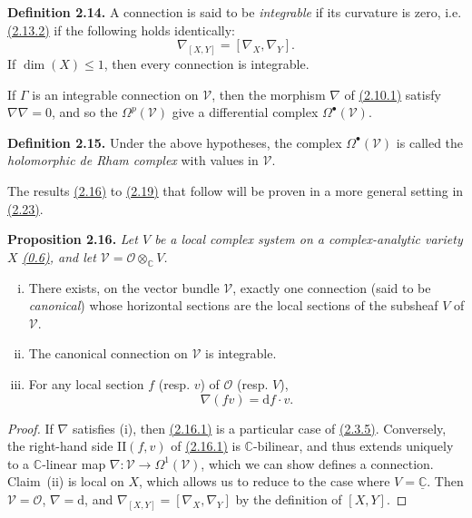 \documentclass{report}
\newenvironment{itenv}[1]
  {\phantomsection\par\medskip\noindent\textbf{#1.}\itshape}
  {\medskip}
\newenvironment{rmenv}[1]
  {\phantomsection\par\medskip\noindent\textbf{#1.}\rmfamily}
  {\medskip}
\renewcommand{\cal}[1]{{\mathcal{#1}}}
\newcommand{\CC}{\mathbb{C}}
\newcommand{\dd}{\mathrm{d}}
\newcommand{\II}{\mathrm{II}}
\renewcommand{\leq}{\leqslant}
\newcommand{\oldpage}[1]{\marginpar{\footnotesize$\Big\vert$ \textit{p.~#1}}}
\begin{document}
\begin{rmenv}{Definition 2.14}
\label{I.2.14}
  A connection is said to be \emph{integrable} if its curvature is zero, i.e. \hyperref[I.2.13.2]{(2.13.2)} if the following holds identically:
  \[
    \nabla_{[X,Y]} = [\nabla_X,\nabla_Y].
  \]
\end{rmenv}
If $\dim(X)\leq1$, then every connection is integrable.

If $\Gamma$ is an integrable connection on $\cal{V}$, then the morphism $\nabla$ of \hyperref[I.2.10.1]{(2.10.1)} satisfy $\nabla\nabla=0$, and so the $\Omega^p(\cal{V})$ give a differential complex $\Omega^\bullet(\cal{V})$.

\begin{rmenv}{Definition 2.15}
\label{I.2.15}
  Under the above hypotheses, the complex $\Omega^\bullet(\cal{V})$ is called the \emph{holomorphic de Rham complex} with values in $\cal{V}$.
\end{rmenv}

\oldpage{12}
The results \hyperref[I.2.16]{(2.16)} to \hyperref[I.2.19]{(2.19)} that follow will be proven in a more general setting in \hyperref[I.2.23]{(2.23)}.

\begin{itenv}{Proposition 2.16}
\label{I.2.16}
  Let $V$ be a local complex system on a complex-analytic variety $X$ \hyperref[0.6]{(0.6)}, and let $\cal{V}=\cal{O}\otimes_\CC V$.
  \begin{enumerate}[(i)]
    \item There exists, on the vector bundle $\cal{V}$, exactly one connection (said to be \emph{canonical}) whose horizontal sections are the local sections of the subsheaf $V$ of $\cal{V}$.
    \item The canonical connection on $\cal{V}$ is integrable.
    \item For any local section $f$ (resp. $v$) of $\cal{O}$ (resp. $V$),
      \[
      \label{I.2.16.1}
        \nabla(fv) = \dd f\cdot v.
      \tag{2.16.1}
      \]
  \end{enumerate}
\end{itenv}

\begin{proof}
  If $\nabla$ satisfies (i), then \hyperref[I.2.16.1]{(2.16.1)} is a particular case of \hyperref[I.2.3.5]{(2.3.5)}.
  Conversely, the right-hand side $\II(f,v)$ of \hyperref[I.2.16.1]{(2.16.1)} is $\CC$-bilinear, and thus extends uniquely to a $\CC$-linear map $\nabla\colon\cal{V}\to\Omega^1(\cal{V})$, which we can show defines a connection.
  Claim~(ii) is local on $X$, which allows us to reduce to the case where $V=\underline{\CC}$.
  Then $\cal{V}=\cal{O}$, $\nabla=\dd$, and $\nabla_{[X,Y]}=[\nabla_X,\nabla_Y]$ by the definition of $[X,Y]$.
\end{proof}
\end{document}
